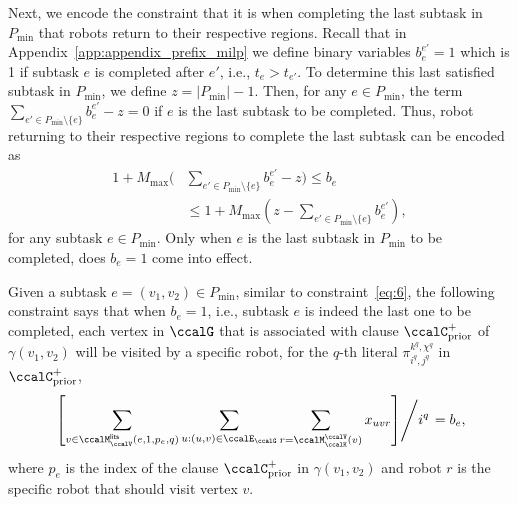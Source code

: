 \documentclass[Afour,sageh,times]{sagej}
\renewcommand{\ap}[3]{\mathcal{\pi}_{{#1},{#2}}^{#3}}
\begin{document}
{{Next, we encode the constraint that it is when completing the last subtask in $P_{\text{min}}$ that robots return to their respective regions. Recall that in Appendix~\ref{app:appendix_prefix_milp} we define binary variables $b_{e}^{e'}=1$ which is 1 if subtask $e$ is completed after  $e'$, i.e., $t_e >  t_{e'}$. To determine this last satisfied subtask in $P_{\text{min}}$,
  we define $z = |P_{\text{min}}| -1$. Then, for any $e \in P_{\text{min}}$, the term $\sum_{e' \in  P_{\text{min}}\setminus \{e \} } b_{e}^{e'} - z  = 0$ if $e$ is the last subtask to be completed. Thus, robot returning to their respective regions to complete the last subtask  can be encoded as
\begin{align}\label{eq:lastsubtask}
  1 + M_{\text{max}} ( &  \sum_{e' \in  P_{\text{min}}\setminus \{e \} } b_{e}^{e'} - z)  \leq  b_e \nonumber \\
  & \leq 1 + M_{\text{max}} (z - \sum_{e' \in  P_{\text{min}}\setminus \{e \} } b_{e}^{e'}),
\end{align}
for any subtask $e \in P_{\text{min}}$. Only when $e$ is the last subtask in $P_{\text{min}}$ to be completed, does $b_e = 1$ come into effect.


Given a subtask $e = (v_1, v_2) \in P_{\text{min}}$, similar to constraint~\eqref{eq:6}, the following constraint says that when $b_e=1$, i.e., subtask $e$ is indeed the last one to be completed,  each vertex in $\ccalG$ that is associated with clause $\ccalC_{\text{prior}}^+$ of $\gamma(v_1, v_2)$ will be visited by a specific robot, for the $q$-th literal $\ap{i^q}{j^q}{k^q,\chi^q}$ in $\ccalC_{\text{prior}}^+$,
\begin{align}\label{eq:return_suffix}
  \left.   \left[ \sum_{v \in \ccalM_\ccalV^\mathsf{lits}(e, 1, p_e, q)}   \sum_{u: (u,v) \in \ccalE_\ccalG}     \sum_{r = \ccalM_{\ccalK}^\ccalV(v) }   x_{uvr} \right] \middle/ {i^q} \right. = b_e,
 \end{align}
where $p_e$ is the index of the clause $\ccalC_{\text{prior}}^+$ in $\gamma(v_1, v_2)$ and robot $r$ is the specific robot that should visit vertex $v$.

}}
\end{document}

